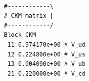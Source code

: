 \documentclass[english,11pt]{article}
\begin{document}
\lstset{basicstyle=\scriptsize, frame=single}
{\tt
\begin{lstlisting}                                                                                                                                                                                                                                                                    
#------------\                                                                                                                                                                                                                                                                             
# CKM matrix |                                                                                                                                                                                                                                                                             
#------------/                                                                                                                                                                                                                                                                             
Block CKM                                                                                                                                                                                                                                                                                  
 11 0.974170e+00 # V_ud                                                                                                                                                                                                                                                                    
 12 0.224800e+00 # V_us                                                                                                                                                                                                                                                                    
 13 0.004090e+00 # V_ub                                                                                                                                                                                                                                                                    
 21 0.220000e+00 # V_cd                                                                                                                                                                                                                                                                    

\end{lstlisting}}
\end{document}
